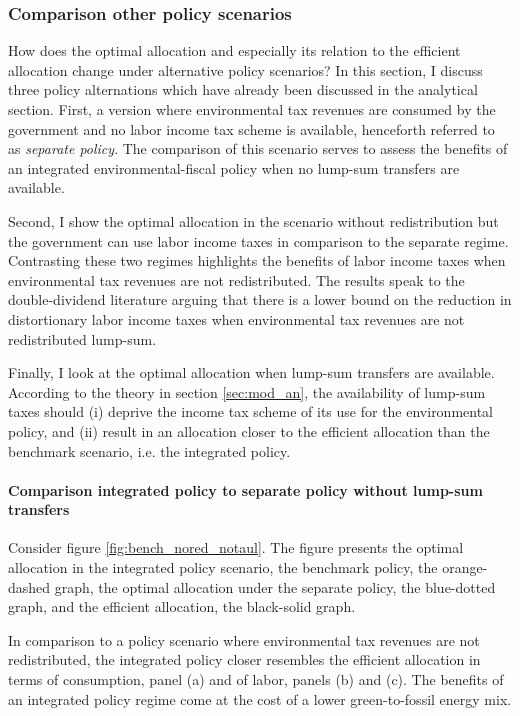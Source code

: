 \subsubsection{Comparison other policy scenarios}
How does the optimal allocation and especially its relation to the efficient allocation change under alternative policy scenarios?
In this section, I discuss three policy alternations which have already been discussed in the analytical section. First, a version where environmental tax revenues are consumed by the government and no labor income tax scheme is available, henceforth referred to as \textit{separate policy}. The comparison of this scenario serves to assess the benefits of an integrated environmental-fiscal policy when no lump-sum transfers are available. 


Second, I show the optimal allocation in the scenario without redistribution but the government can use labor income taxes in comparison to the separate regime. Contrasting these two regimes highlights the benefits of labor income taxes  when environmental tax revenues are not redistributed. The results speak to the double-dividend literature arguing that there is a lower bound on the reduction in distortionary labor income taxes when environmental tax revenues are not redistributed lump-sum. 

Finally, I look at the optimal allocation when lump-sum transfers are available. According to the theory in section \ref{sec:mod_an}, the availability of lump-sum taxes should (i) deprive the income tax scheme of its use for the environmental policy, and (ii) result in an allocation closer to the efficient allocation than the benchmark scenario, i.e. the integrated policy. 


\paragraph{Comparison integrated policy to separate policy without lump-sum transfers}

Consider figure \ref{fig:bench_nored_notaul}. The figure presents the optimal allocation in the integrated policy scenario, the benchmark policy,  the orange-dashed graph, the optimal allocation under the separate policy, the blue-dotted graph, and the efficient allocation, the black-solid graph.

In comparison to a policy scenario where environmental tax revenues are not redistributed, the integrated policy closer resembles the efficient allocation in terms of consumption, panel (a) and of labor, panels (b) and (c). %
The benefits of an integrated policy regime come at the cost of a lower green-to-fossil energy mix. 

